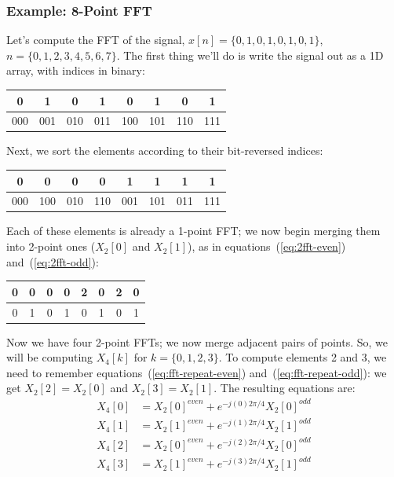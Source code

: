 \subsubsection{Example: 8-Point FFT}

Let's compute the FFT of the signal, $x[n] = \{0, 1, 0, 1, 0, 1, 0,
1\}$, $n = \{0, 1, 2, 3, 4, 5, 6, 7\}$. The first thing we'll do is
write the signal out as a 1D array, with indices in binary:
\begin{center}
  \begin{tabular}{|c|c|c|c|c|c|c|c|} \hline
    0   & 1   & 0   & 1   & 0   & 1   & 0   & 1   \\ \hline
    000 & 001 & 010 & 011 & 100 & 101 & 110 & 111 \\ \hline
  \end{tabular}
\end{center}

Next, we sort the elements according to their bit-reversed indices:
\begin{center}
  \begin{tabular}{|c|c|c|c|c|c|c|c|} \hline
    0   & 0   & 0   & 0   & 1   & 1   & 1   & 1   \\ \hline
    000 & 100 & 010 & 110 & 001 & 101 & 011 & 111 \\ \hline
  \end{tabular}
\end{center}

Each of these elements is already a 1-point FFT; we now begin merging
them into 2-point ones ($X_2[0]$ and $X_2[1]$), as in
equations~(\ref{eq:2fft-even}) and~(\ref{eq:2fft-odd}):
\begin{center}
  \begin{tabular}{|c|c||c|c||c|c||c|c|} \hline
    0   & 0   & 0   & 0   & 2   & 0   & 2   & 0   \\ \hline
    0   & 1   & 0   & 1   & 0   & 1   & 0   & 1   \\ \hline
  \end{tabular}
\end{center}

Now we have four 2-point FFTs; we now merge adjacent pairs of
points. So, we will be computing $X_4[k]$ for $k=\{0, 1, 2, 3\}$. To
compute elements 2 and 3, we need to remember
equations~(\ref{eq:fft-repeat-even}) and~(\ref{eq:fft-repeat-odd}): we
get $X_2[2] = X_2[0]$ and $X_2[3] = X_2[1]$. The resulting equations
are:
\begin{align*}
  X_4[0] &= X_2[0]^{\mathit{even}} +   e^{-j(0)2\pi/4}X_2[0]^{\mathit{odd}} \\
  X_4[1] &= X_2[1]^{\mathit{even}} +   e^{-j(1)2\pi/4}X_2[1]^{\mathit{odd}} \\
  X_4[2] &= X_2[0]^{\mathit{even}} +   e^{-j(2)2\pi/4}X_2[0]^{\mathit{odd}} \\
  X_4[3] &= X_2[1]^{\mathit{even}} +   e^{-j(3)2\pi/4}X_2[1]^{\mathit{odd}}
\end{align*}

